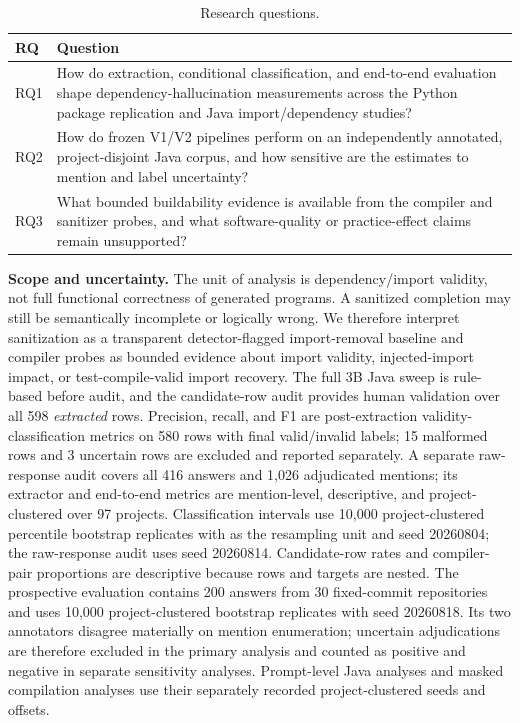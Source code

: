 \documentclass[pdflatex,sn-basic]{sn-jnl}
\newcommand{\codeid}[1]{\texttt{\detokenize{#1}}}
\begin{document}
\begin{table}[htbp]
\caption{Research questions.}
\label{tab:research-questions}
\begin{tabularx}{\linewidth}{@{}lY@{}}
\toprule
RQ & Question \\
\midrule
RQ1 & How do extraction, conditional classification, and end-to-end evaluation shape dependency-hallucination measurements across the Python package replication and Java import/dependency studies? \\
RQ2 & How do frozen V1/V2 pipelines perform on an independently annotated, project-disjoint Java corpus, and how sensitive are the estimates to mention and label uncertainty? \\
RQ3 & What bounded buildability evidence is available from the compiler and sanitizer probes, and what software-quality or practice-effect claims remain unsupported? \\
\bottomrule
\end{tabularx}
\end{table}

\par

\textbf{Scope and uncertainty.} The unit of analysis is dependency/import validity, not full functional correctness of generated programs. A sanitized completion may still be semantically incomplete or logically wrong. We therefore interpret sanitization as a transparent detector-flagged import-removal baseline and compiler probes as bounded evidence about import validity, injected-import impact, or test-compile-valid import recovery. The full 3B Java sweep is rule-based before audit, and the candidate-row audit provides human validation over all 598 \emph{extracted} rows. Precision, recall, and F1 are post-extraction validity-classification metrics on 580 rows with final valid/invalid labels; 15 malformed rows and 3 uncertain rows are excluded and reported separately. A separate raw-response audit covers all 416 answers and 1,026 adjudicated mentions; its extractor and end-to-end metrics are mention-level, descriptive, and project-clustered over 97 projects. Classification intervals use 10,000 project-clustered percentile bootstrap replicates with \codeid{project_path} as the resampling unit and seed 20260804; the raw-response audit uses seed 20260814. Candidate-row rates and compiler-pair proportions are descriptive because rows and targets are nested. The prospective evaluation contains 200 answers from 30 fixed-commit repositories and uses 10,000 project-clustered bootstrap replicates with seed 20260818. Its two annotators disagree materially on mention enumeration; uncertain adjudications are therefore excluded in the primary analysis and counted as positive and negative in separate sensitivity analyses. Prompt-level Java analyses and masked compilation analyses use their separately recorded project-clustered seeds and offsets.
\end{document}
